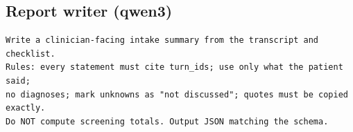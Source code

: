 \documentclass[11pt]{article}
\begin{document}
\subsection{Report writer (qwen3)}
\begin{lstlisting}[style=json]
Write a clinician-facing intake summary from the transcript and checklist.
Rules: every statement must cite turn_ids; use only what the patient said;
no diagnoses; mark unknowns as "not discussed"; quotes must be copied exactly.
Do NOT compute screening totals. Output JSON matching the schema.
\end{lstlisting}
\end{document}
